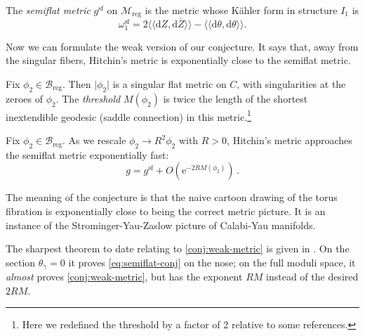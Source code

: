\documentclass[12pt,letterpaper,reqno]{article}
\numberwithin{equation}{section}
\begin{document}
\begin{defn}
The \textit{semiflat metric}  $g^{\mathrm{sf}}$ on $\mathcal M_\mathrm{reg}$ is the metric 
whose K\"ahler form in structure $I_1$ is
\begin{equation} \label{eq:omega1-sf}
  \omega^{\mathrm{sf}}_1 = 2 \langle\!\langle \mathrm{d} Z, \mathrm{d} \overline{Z} \rangle\!\rangle - \langle\!\langle \mathrm{d} \theta, \mathrm{d} \theta \rangle\!\rangle.
\end{equation}
\end{defn}                                   

Now we can formulate the weak version of our conjecture.
It says that, away from the singular fibers, Hitchin's
metric is exponentially close to the semiflat metric.

\begin{defn}[Threshold]
Fix $\phi_2 \in \mathcal B_\mathrm{reg}$. Then $\lvert \phi_2 \rvert$ is a singular flat metric on $C$, with singularities at the
zeroes of $\phi_2$. The \textit{threshold} $M(\phi_2)$
is twice the length of the shortest inextendible geodesic
(saddle connection) in this metric.\footnote{Here we redefined the threshold by a factor of 2 relative to some references.}
\end{defn}

\begin{conj} \label{conj:weak-metric}
Fix $\phi_2 \in \mathcal B_\mathrm{reg}$.
As we rescale $\phi_2 \to R^2 \phi_2$ with $R > 0$,
Hitchin's metric approaches the semiflat metric
exponentially fast:
\begin{equation} \label{eq:semiflat-conj}
  g = g^{\mathrm{sf}} + O(\mathrm e^{-2 R M(\phi_2)}) \, .
\end{equation}
\end{conj}

The meaning of the conjecture is that the naive cartoon drawing of the
torus fibration is exponentially close to being the correct metric picture.
It is an instance of the Strominger-Yau-Zaslow picture of Calabi-Yau
manifolds.

The sharpest theorem to date relating to \autoref{conj:weak-metric} is
given in \cite{mochizuki2024comparison}. On
the section $\theta_\gamma = 0$
it proves \eqref{eq:semiflat-conj} on the nose; 
on the full moduli space, it \textit{almost} proves
\autoref{conj:weak-metric}, but has the 
exponent $RM$ instead of the desired $2RM$.
\end{document}
